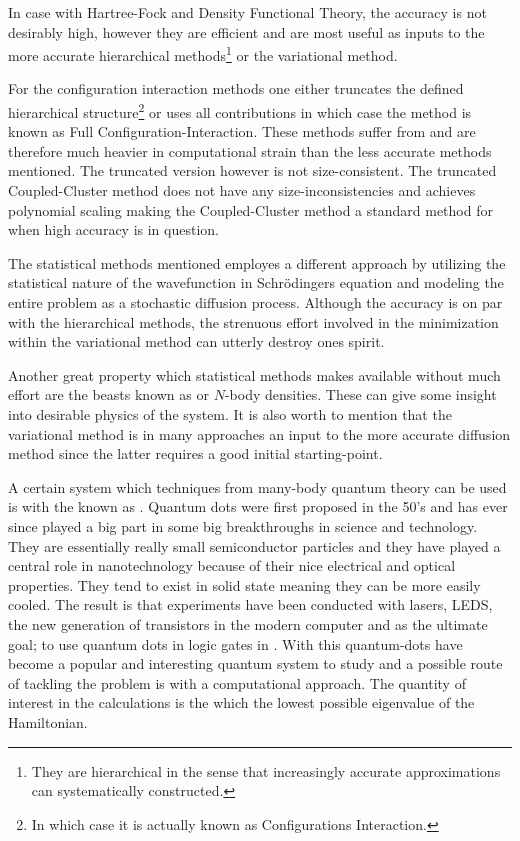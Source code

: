     In case with Hartree-Fock and Density Functional Theory, the accuracy is
    not desirably high, however they are efficient and are most useful as
    inputs to the more accurate hierarchical methods\footnote{They are
    hierarchical in the sense that increasingly accurate approximations can
    systematically constructed.} or the variational method.

    For the configuration interaction methods one either truncates the defined
    hierarchical structure\footnote{In which case it is actually known as
    Configurations Interaction.} or uses all contributions in which case the
    method is known as Full Configuration-Interaction. These methods suffer
    from  and are therefore much heavier in
    computational strain than the less accurate methods mentioned. The
    truncated version however is not size-consistent.  The truncated
    Coupled-Cluster method does not have any size-inconsistencies and achieves
    polynomial scaling making the Coupled-Cluster method a standard method for
    when high accuracy is in question. 

    The statistical methods mentioned employes a different approach by
    utilizing the statistical nature of the wavefunction in Schrödingers
    equation and modeling the entire problem as a stochastic diffusion process.
    Although the accuracy is on par with the hierarchical methods, the
    strenuous effort involved in the minimization within the variational method
    can utterly destroy ones spirit.

    Another great property which statistical methods makes available without
    much effort are the beasts known as  or $N$-body
    densities. These can give some insight into desirable physics of the
    system. It is also worth to mention that the variational method is in many
    approaches an input to the more accurate diffusion method since the latter
    requires a good initial starting-point.

    A certain system which techniques from many-body quantum theory can be used
    is with the  known as .
    Quantum dots were first proposed in the 50's and has ever since played a
    big part in some big breakthroughs in science and technology. They are
    essentially really small semiconductor particles and they have played a
    central role in nanotechnology because of their nice electrical and optical
    properties. They tend to exist in solid state meaning they can be more
    easily cooled. The result is that experiments have been conducted with
    lasers, LEDS, the new generation of transistors in the modern computer and
    as the ultimate goal; to use quantum dots in logic gates in . With this quantum-dots have become a popular and interesting
    quantum system to study and a possible route of tackling the problem is
    with a computational approach. The quantity of interest in the calculations
    is the  which the lowest possible eigenvalue of
    the Hamiltonian.

